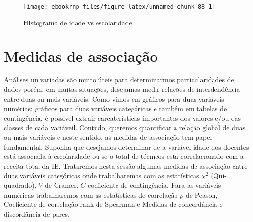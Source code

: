 \documentclass[11pt,]{style/krantz}
\makeatletter
\newenvironment{Shaded}{\begin{snugshade}}{\end{snugshade}}
\newcommand{\DataTypeTok}[1]{\textcolor[rgb]{0.13,0.29,0.53}{#1}}
\newcommand{\DecValTok}[1]{\textcolor[rgb]{0.00,0.00,0.81}{#1}}
\newcommand{\KeywordTok}[1]{\textcolor[rgb]{0.13,0.29,0.53}{\textbf{#1}}}
\newcommand{\NormalTok}[1]{#1}
\newcommand{\OperatorTok}[1]{\textcolor[rgb]{0.81,0.36,0.00}{\textbf{#1}}}
\newcommand{\OtherTok}[1]{\textcolor[rgb]{0.56,0.35,0.01}{#1}}
\newcommand{\StringTok}[1]{\textcolor[rgb]{0.31,0.60,0.02}{#1}}
\newenvironment{kframe}{%
\medskip{}
\setlength{\fboxsep}{.8em}
 \def\at@end@of@kframe{}%
 \ifinner\ifhmode%
  \def\at@end@of@kframe{\end{minipage}}%
  \begin{minipage}{\columnwidth}%
 \fi\fi%
 \def\FrameCommand##1{\hskip\@totalleftmargin \hskip-\fboxsep
 \colorbox{shadecolor}{##1}\hskip-\fboxsep
     \hskip-\linewidth \hskip-\@totalleftmargin \hskip\columnwidth}%
 \MakeFramed {\advance\hsize-\width
   \@totalleftmargin\z@ \linewidth\hsize
   \@setminipage}}%
 {\par\unskip\endMakeFramed%
 \at@end@of@kframe}
\renewenvironment{Shaded}{\begin{kframe}}{\end{kframe}}
\theoremstyle{definition}
\theoremstyle{definition}
\theoremstyle{definition}
\theoremstyle{remark}
\makeatother
\begin{document}
\begin{Shaded}
\end{Shaded}

\begin{figure}[H]

{\centering \texttt{[image: ebookrnp\_files/figure-latex/unnamed-chunk-88-1]} 

}

\caption{Histograma de idade vs escolaridade}\label{fig:unnamed-chunk-88}
\end{figure}

\hypertarget{medidas-de-associacao}{%
\section{Medidas de associação}\label{medidas-de-associacao}}

Análises univariadas são muito úteis para determinarmos particularidades de dados porém, em muitas situações, desejamos medir relações de interdendência entre duas ou mais variáveis. Como vimos em gráficos para duas variáveis numérias; gráficos para duas variáveis categóricas e também em tabelas de contingência, é possivel extrair carcaterísticas importantes dos valores e/ou das classes de cada variáveil. Contudo, queremos quantificar a relação global de duas ou mais variáveis e neste sentido, as medidas de associação tem papel fundamental. Suponha que desejamos determinar de a variável idade dos docentes está associada à escolaridade ou se o total de técnicos está correlacionado com a receita total da IE.
Trataremos nesta sessão algumas medidas de associação entre duas variáveis categóricas onde trabalharemos com as estatísticas \(\chi^2\) (Qui-quadrado), \(V\) de Cramer, \(C\) coeficiente de contingência. Para as variáveis numéricas trabalharemos com as estatísticas de correlação \(\rho\) de Peason, Coeficiente de correlação rank de Spearman e Medidas de concordância e discordância de pares.
\end{document}
